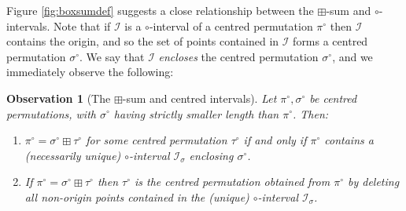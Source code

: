 \documentclass[11pt,a4paper]{article}
\newtheorem{obs}[thm]{Observation}
\theoremstyle{definition}
\newtheorem{comment}[thm]{Comment}
\begin{document}

Figure \ref{fig:boxsumdef} suggests a close relationship between the $\boxplus$-sum and $\circ$-intervals. Note that if $\mathcal{I}$ is a $\circ$-interval of a centred permutation $\pi^{\circ}$ then $\mathcal{I}$ contains the origin, and so the set of points contained in $\mathcal{I}$ forms a centred permutation $\sigma^{\circ}$. We say that $\mathcal{I}$ \emph{encloses} the centred permutation $\sigma^{\circ}$, and we immediately observe the following:

\begin{obs}[The $\boxplus$-sum and centred intervals] \label{intsum}
Let $\pi^{\circ},\sigma^{\circ}$ be centred permutations, with $\sigma^{\circ}$ having strictly smaller length than $\pi^{\circ}$. Then:
\begin{enumerate}
\item $\pi^{\circ} = \sigma^{\circ} \boxplus \tau^{\circ}$ for some centred permutation $\tau^{\circ}$ if and only if $\pi^{\circ}$ contains a (necessarily unique) $\circ$-interval $\mathcal{I}_{\sigma}$ enclosing $\sigma^{\circ}$.
\item If $\pi^{\circ} = \sigma^{\circ} \boxplus \tau^{\circ}$ then $\tau^{\circ}$ is the centred permutation obtained from $\pi^{\circ}$ by deleting all non-origin points contained in the (unique) $\circ$-interval $\mathcal{I}_{\sigma}$.
\end{enumerate}
\end{obs}
\end{document}
